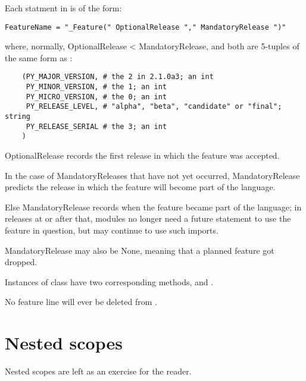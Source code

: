 Each statment in  is of the form:

\begin{verbatim}
FeatureName = "_Feature(" OptionalRelease "," MandatoryRelease ")"
\end{verbatim}

where, normally, OptionalRelease <  MandatoryRelease, and both are
5-tuples of the same form as :

\begin{verbatim}
    (PY_MAJOR_VERSION, # the 2 in 2.1.0a3; an int
     PY_MINOR_VERSION, # the 1; an int
     PY_MICRO_VERSION, # the 0; an int
     PY_RELEASE_LEVEL, # "alpha", "beta", "candidate" or "final"; string
     PY_RELEASE_SERIAL # the 3; an int
    )
\end{verbatim}

OptionalRelease records the first release in which the feature was
accepted. 

In the case of MandatoryReleases that have not yet occurred,
MandatoryRelease predicts the release in which the feature will become
part of the language.

Else MandatoryRelease records when the feature became part of the
language; in releases at or after that, modules no longer need a
future statement to use the feature in question, but may continue to
use such imports. 

MandatoryRelease may also be None, meaning that a planned feature got
dropped.

Instances of class  have two corresponding methods,
 and .

No feature line will ever be deleted from .

\section{Nested scopes}

Nested scopes are left as an exercise for the reader.
